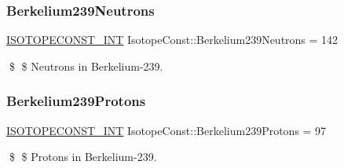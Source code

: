 \subsubsection{\texorpdfstring{Berkelium239\+Neutrons}{Berkelium239Neutrons}}
{\footnotesize\ttfamily \mbox{\hyperlink{group___isotope_const-_macros_ga5f18360b3e99483a35c32d789e62621c}{I\+S\+O\+T\+O\+P\+E\+C\+O\+N\+S\+T\+\_\+\+I\+NT}} Isotope\+Const\+::\+Berkelium239\+Neutrons = 142}

\$ \$ Neutrons in Berkelium-\/239. \mbox{\label{group___isotope_const-_berkelium-_bk239_ga00b9cdc1786a4596b08eccbf5518097a}} 
\subsubsection{\texorpdfstring{Berkelium239\+Protons}{Berkelium239Protons}}
{\footnotesize\ttfamily \mbox{\hyperlink{group___isotope_const-_macros_ga5f18360b3e99483a35c32d789e62621c}{I\+S\+O\+T\+O\+P\+E\+C\+O\+N\+S\+T\+\_\+\+I\+NT}} Isotope\+Const\+::\+Berkelium239\+Protons = 97}

\$ \$ Protons in Berkelium-\/239. 